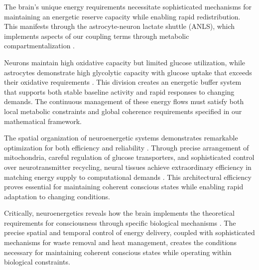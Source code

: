 The brain's unique energy requirements necessitate sophisticated mechanisms for maintaining an energetic reserve capacity while enabling rapid redistribution. This manifests through the astrocyte-neuron lactate shuttle (ANLS), which implements aspects of our coupling terms through metabolic compartmentalization \cite{Pellerin2012}. 

Neurons maintain high oxidative capacity but limited glucose utilization, while astrocytes demonstrate high glycolytic capacity with glucose uptake that exceeds their oxidative requirements \cite{Magistretti2015}. This division creates an energetic buffer system that supports both stable baseline activity and rapid responses to changing demands. The continuous management of these energy flows must satisfy both local metabolic constraints and global coherence requirements specified in our mathematical framework.

The spatial organization of neuroenergetic systems demonstrates remarkable optimization for both efficiency and reliability \cite{Attwell2001}. Through precise arrangement of mitochondria, careful regulation of glucose transporters, and sophisticated control over neurotransmitter recycling, neural tissues achieve extraordinary efficiency in matching energy supply to computational demands \cite{Harris2012}. This architectural efficiency proves essential for maintaining coherent conscious states while enabling rapid adaptation to changing conditions.

Critically, neuroenergetics reveals how the brain implements the theoretical requirements for consciousness through specific biological mechanisms \cite{Hertz2007}. The precise spatial and temporal control of energy delivery, coupled with sophisticated mechanisms for waste removal and heat management, creates the conditions necessary for maintaining coherent conscious states while operating within biological constraints.